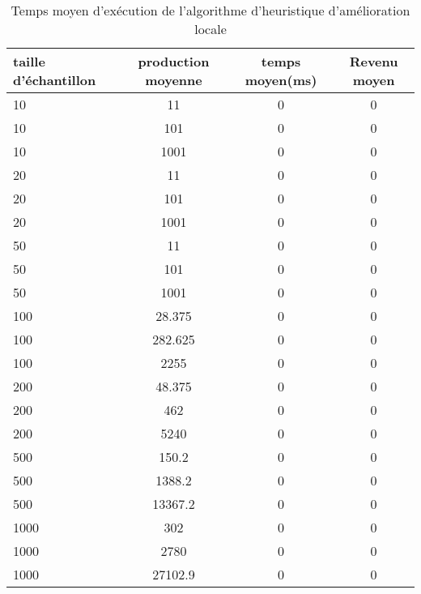 \documentclass[a4paper, 12pt]{article} %
\begin{document}
\begin{table}[H]
\caption{Temps moyen d'exécution de l'algorithme d'heuristique d'amélioration locale}
\centering
\begin{tabular}{| l | c | c | c |}
\hline
taille d'échantillon & production moyenne & temps moyen(ms)  & Revenu moyen\\
\hline
10 & 11 & 0 & 0\\
\hline
10 & 101 & 0 & 0\\
\hline
10 & 1001 & 0 & 0\\
\hline
20 & 11 & 0 & 0\\
\hline
20 & 101 & 0 & 0\\
\hline
20 & 1001 & 0 & 0\\
\hline
50 & 11 & 0 & 0\\
\hline
50 & 101 & 0 & 0\\
\hline
50 & 1001 & 0 & 0\\
\hline
100 & 28.375 & 0 & 0\\
\hline
100 & 282.625 & 0 & 0\\
\hline
100 & 2255 & 0 & 0\\
\hline
200 & 48.375 & 0 & 0\\
\hline
200 & 462 & 0 & 0\\
\hline
200 & 5240 & 0 & 0\\
\hline
500 & 150.2 & 0& 0\\
\hline
500 & 1388.2 & 0 & 0\\
\hline
500 & 13367.2 & 0 & 0\\
\hline
1000 & 302 & 0 & 0\\
\hline
1000 & 2780 & 0 & 0\\
\hline
1000 & 27102.9 & 0 & 0\\
\hline
\end{tabular}
\end{table}
\end{document}
